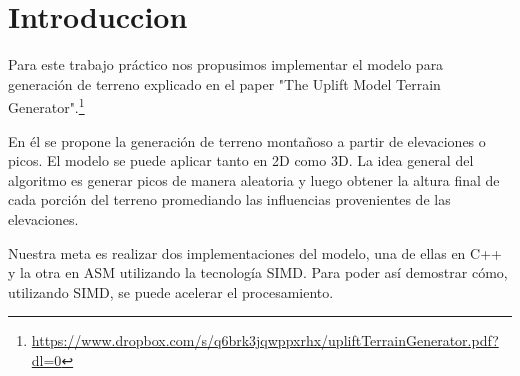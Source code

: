 \section{Introduccion}

Para este trabajo práctico nos propusimos implementar el modelo para generación de terreno explicado en el paper "The Uplift Model Terrain Generator".\footnote{\url{https://www.dropbox.com/s/q6brk3jqwppxrhx/upliftTerrainGenerator.pdf?dl=0}}

En él se propone la generación de terreno montañoso a partir de elevaciones o picos. El modelo se puede aplicar tanto en 2D como 3D. La idea general del algoritmo es generar picos de manera aleatoria y luego obtener la altura final de cada porción del terreno promediando las influencias provenientes de las elevaciones.

Nuestra meta es realizar dos implementaciones del modelo, una de ellas en C++ y la otra en ASM utilizando la tecnología SIMD. Para poder así demostrar cómo, utilizando SIMD, se puede acelerar el procesamiento.